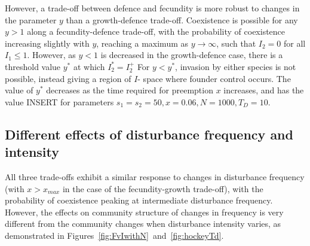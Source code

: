 \documentclass[a4paper]{article}
\begin{document}
However, a trade-off between defence and fecundity is more robust to changes in the parameter $y$ than a growth-defence trade-off. Coexistence is possible for any $y>1$ along a fecundity-defence trade-off, with the probability of coexistence increasing slightly with $y$, reaching a maximum as $y \to \infty$, such that $I_2=0$ for all $I_1 \leq 1$. However, as $y<1$ is decreased in the growth-defence case, there is a threshold value $y^*$ at which $I_2^*=I_2^+$ For $y<y^*$, invasion by either species is not possible, instead giving a region of $I$- space where founder control occurs. The value of $y^*$ decreases as the time required for preemption $x$ increases, and has the value INSERT for parameters $s_1=s_2=50,x=0.06,N=1000,T_D=10$.

\subsection{Different effects of disturbance frequency and intensity}
All three trade-offs exhibit a similar response to changes in disturbance frequency (with $x>x_{max}$ in the case of the fecundity-growth trade-off), with the probability of coexistence peaking at intermediate disturbance frequency. However, the effects on community structure of changes in frequency is very different from the community changes when disturbance intensity varies, as demonstrated in Figures~\ref{fig:FvIwithN}~and~\ref{fig:hockeyTd}. 
\end{document}
